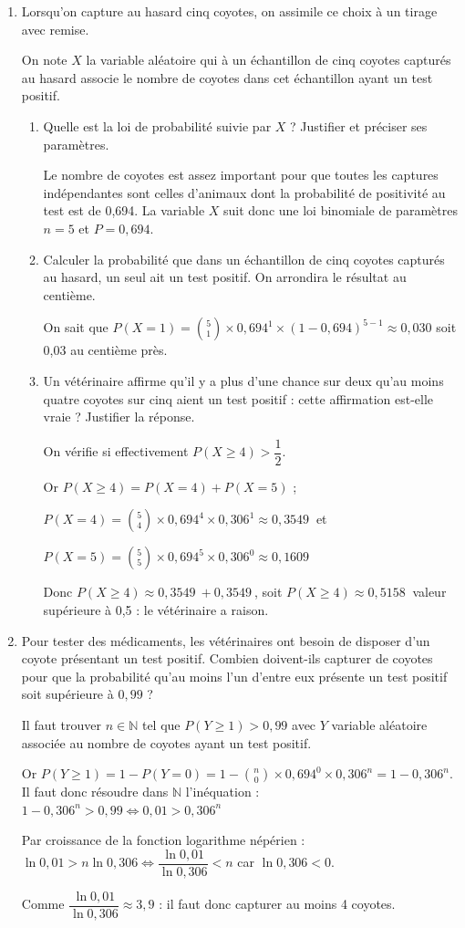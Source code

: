 \documentclass[10pt]{article}
\providecommand{\N}{\mathbb{N}}
\providecommand{\np}[2][]{{#2~#1}}
\begin{document}
\begin{enumerate}
\item Lorsqu'on capture au hasard cinq coyotes, on assimile ce choix à un tirage avec remise.

On note $X$ la variable aléatoire qui à un échantillon de cinq coyotes capturés au hasard associe le nombre de coyotes dans cet échantillon ayant un test positif.
\begin{enumerate}
\item Quelle est la loi de probabilité suivie par $X$ ? Justifier et préciser ses paramètres.

Le nombre de coyotes est assez important pour que toutes les captures indépendantes sont celles d'animaux dont la probabilité de positivité au test est de 0,694. La variable $X$ suit donc une loi binomiale de paramètres $n = 5$ et $P = 0,694$.
\item Calculer la probabilité que dans un échantillon de cinq coyotes capturés au hasard, un seul ait un test positif. On arrondira le résultat au centième.

On sait que $P(X = 1) = \binom{5}{1} \times 0,694^1 \times (1 - 0,694)^{5 - 1} \approx 0,030$ soit 0,03 au centième près.
\item Un vétérinaire affirme qu'il y a plus d'une chance sur deux qu'au moins quatre coyotes sur cinq aient un test positif : cette affirmation est-elle vraie ? Justifier la réponse.

On vérifie si effectivement $P(X \geqslant 4) > \dfrac{1}{2}$.

Or $P(X \geqslant 4) = P(X = 4) + P(X = 5)$ ;

$P(X = 4) = \binom{5}{4}\times 0,694^4 \times 0,306^1 \approx \np{0,3549}$ et 

$P(X = 5) = \binom{5}{5}\times 0,694^5 \times 0,306^0 \approx \np{0,1609}$

Donc $P(X \geqslant 4) \approx \np{0,3549} + \np{0,3549}$, soit $P(X \geqslant 4) \approx \np{0,5158}$ valeur supérieure à 0,5 : le vétérinaire a raison.
	\end{enumerate}	
\item Pour tester des médicaments, les vétérinaires ont besoin de disposer d'un coyote présentant un test positif. Combien doivent-ils capturer de coyotes pour que la probabilité qu'au moins l'un d'entre eux présente un test positif soit supérieure à $0,99$ ?

Il faut trouver $n \in \N$ tel que $P(Y \geqslant 1) > 0,99$ avec $Y$ variable aléatoire associée au nombre de coyotes ayant un test positif.

Or $P(Y \geqslant 1) = 1 - P(Y = 0) = 1 - \binom{n}{0}\times 0,694^0 \times 0,306^n = 1 - 0,306^n$.
Il faut donc résoudre dans $\N$ l'inéquation : $1 - 0,306^n > 0,99 \iff 0,01 > 0,306^n$

Par croissance de la fonction logarithme népérien : $\ln 0,01 > n \ln 0,306 \iff \dfrac{\ln 0,01}{\ln 0,306} < n$ car $\ln 0,306 < 0$.

Comme $\dfrac{\ln 0,01}{\ln 0,306} \approx 3,9$ : il faut donc capturer au moins 4 coyotes.
\end{enumerate}

\bigskip
\end{document}
